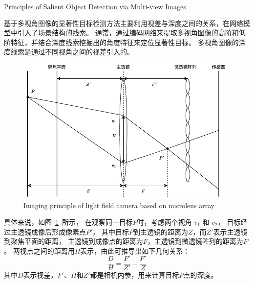 



{Principles of Salient Object Detection via Multi-view Images}


基于多视角图像的显著性目标检测方法主要利用视差与深度之间的关系，在网络模型中引入了场景结构的线索。
通常，通过编码网络来提取多视角图像的高阶和低阶特征，并结合深度线索挖掘出的角度特征来定位显著性目标。
多视角图像的深度线索是通过不同视角之间的视差引入的。

\begin{figure}[b]
	\centering
	\includegraphics[width=0.80\linewidth]{figures/chapter2/microlens_array_imaging.drawio}
	{Imaging principle of light field camera based on microlens array}  
	\label{cpt2_fig8:multi_array}
\end{figure}

具体来说，如图~\ref{cpt2_fig8:multi_array}~所示，
在观察同一目标$P$时，考虑两个视角 $v_{1}$ 和 $v_{2}$，
目标经过主透镜成像后形成像素点$P'$，
其中目标$P$到主透镜的距离为$Z$，而$Z'$表示主透镜到聚焦平面的距离，
主透镜到成像点的距离为$F$，主透镜到微透镜阵列的距离为$F'$。
两视点之间的距离用$H$表示，由此可推导出如下几何关系：
%
%
\begin{equation}
	\frac{D}{H} = \frac{F'}{Z'} - \frac{F'}{Z} 
	\label{cpt2_fac1:relate}
\end{equation}
%
%
其中$D$表示视差，$F'$、$H$和$Z'$都是相机内参，用来计算目标$P$点的深度。








